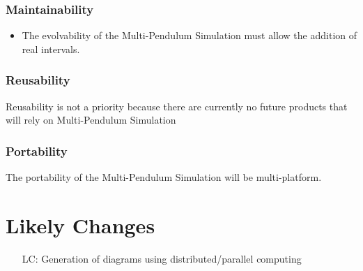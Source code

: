 \documentclass[12pt]{article}
\newcounter{lcnum} %
\newcommand{\progname}{Multi-Pendulum Simulation }
\begin{document}
\subsubsection*{Maintainability}
\begin{itemize}
	\item The evolvability of the \progname must allow the addition 
	of real intervals.
\end{itemize}

\subsubsection*{Reusability}
Reusability is not a priority because there are currently no future products 
that will rely on \progname

\subsubsection*{Portability}
The portability of the \progname will be multi-platform.

\newpage

\section{Likely Changes}    

\noindent \begin{itemize}

\item[LC\refstepcounter{lcnum}\thelcnum:] Generation of diagrams 
  using distributed/parallel computing

\end{itemize}
\end{document}
